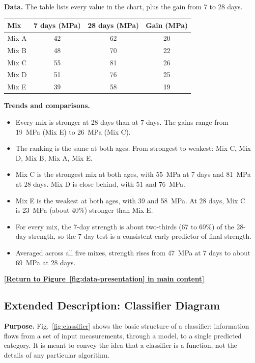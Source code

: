 \documentclass[11pt]{article}
\begin{document}
\textbf{Data.} The table lists every value in the chart, plus the gain from 7 to 28 days.

\medskip
{}
\begin{tabular}{l c c c}
    \toprule
    \textbf{Mix} & \textbf{7 days (MPa)} & \textbf{28 days (MPa)} & \textbf{Gain (MPa)} \\
    \midrule
    Mix A & 42 & 62 & 20 \\
    Mix B & 48 & 70 & 22 \\
    Mix C & 55 & 81 & 26 \\
    Mix D & 51 & 76 & 25 \\
    Mix E & 39 & 58 & 19 \\
    \bottomrule
\end{tabular}

\medskip
\textbf{Trends and comparisons.}
\begin{itemize}
    \item Every mix is stronger at 28 days than at 7 days. The gains range from 19~MPa (Mix E) to 26~MPa (Mix C).
    \item The ranking is the same at both ages. From strongest to weakest: Mix C, Mix D, Mix B, Mix A, Mix E.
    \item Mix C is the strongest mix at both ages, with 55~MPa at 7 days and 81~MPa at 28 days. Mix D is close behind, with 51 and 76~MPa.
    \item Mix E is the weakest at both ages, with 39 and 58~MPa. At 28 days, Mix C is 23~MPa (about 40\%) stronger than Mix E.
    \item For every mix, the 7-day strength is about two-thirds (67 to 69\%) of the 28-day strength, so the 7-day test is a consistent early predictor of final strength.
    \item Averaged across all five mixes, strength rises from 47~MPa at 7 days to about 69~MPa at 28 days.
\end{itemize}


\hyperref[anchor:data-presentation-return]{\textbf{[Return to Figure~\ref*{fig:data-presentation} in main content]}}

\subsection{Extended Description: Classifier Diagram}
\label{sec:classifier-desc}
\textbf{Purpose.} Fig.~\ref{fig:classifier} shows the basic structure of a classifier: information flows from a set of input measurements, through a model, to a single predicted category. It is meant to convey the idea that a classifier is a function, not the details of any particular algorithm.
\end{document}
